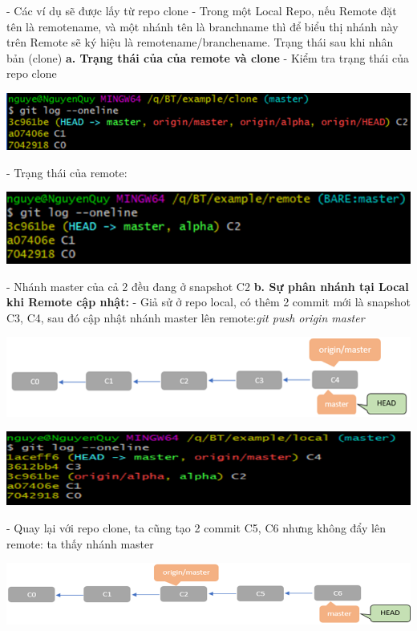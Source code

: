 \documentclass[12pt,a4paper]{report}
\begin{document}
 - Các ví dụ sẽ được lấy từ repo clone\vskip 0.4cm
 - Trong một Local Repo, nếu Remote đặt tên là remotename, và một nhánh tên là branchname thì để biểu thị nhánh này trên Remote sẽ ký hiệu là remotename/branchename. Trạng thái sau khi nhân bản (clone)\vskip 0.4cm
 {\bf a. Trạng thái của của remote và clone}\vskip 0.4cm
 - Kiểm tra trạng thái của repo clone\vskip 0.4cm

 	\includegraphics[width=0.8\linewidth]{screenshot067}
 
 	\label{fig:screenshot067}
\vskip 0.4cm\vskip 0.4cm
 - Trạng thái của remote:\vskip 0.4cm

 	\includegraphics[width=0.8\linewidth]{screenshot068}

 	\label{fig:screenshot068}
\vskip 0.4cm\vskip 0.4cm
 - Nhánh master của cả 2 đều đang ở snapshot C2\vskip 0.4cm
{\bf b. Sự phân nhánh tại Local khi Remote cập nhật:}\vskip 0.4cm
 - Giả sử ở repo local, có thêm 2 commit mới là snapshot C3, C4, sau đó cập nhật nhánh master lên remote:{\it git push origin master}\vskip 0.4cm


 	\includegraphics[width=0.8\linewidth]{screenshot069}

 	\label{fig:screenshot069}
\vskip 0.4cm\vskip 0.4cm
 	\includegraphics[width=0.8\linewidth]{screenshot070}
 
 	\label{fig:screenshot070}\vskip 0.4cm\vskip 0.4cm

 - Quay lại với repo clone, ta cũng tạo 2 commit C5, C6 nhưng không đẩy lên remote: ta thấy nhánh master \vskip 0.4cm
 
 	\includegraphics[width=0.8\linewidth]{screenshot071}
 
\end{document}

